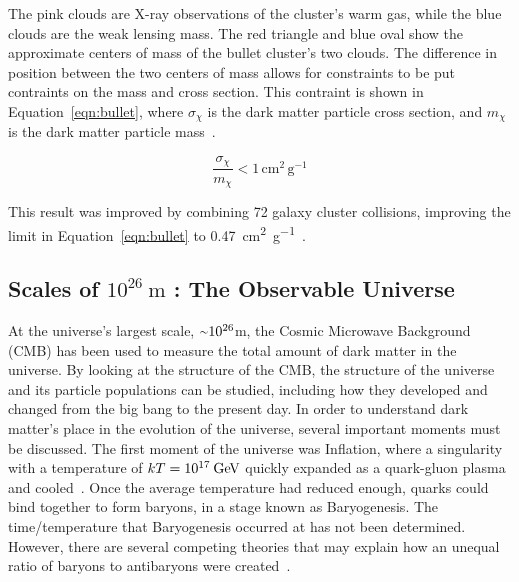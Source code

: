 The pink clouds are X-ray observations of the cluster's warm gas, while the blue clouds are the weak lensing mass.
The red triangle and blue oval show the approximate centers of mass of the bullet cluster's two clouds.
The difference in position between the two centers of mass allows for constraints to be put contraints on the mass and cross section.
This contraint is shown in Equation~\ref{eqn:bullet}, where $\sigma_{\chi}$ is the dark matter particle cross section, and $m_{\chi}$ is the dark matter particle mass~\cite{bullet_cluster,bullet_cluster2}.

\begin{equation}\label{eqn:bullet}
  \frac{\sigma_{\chi}}{m_{\chi}} < 1 \, \textrm{cm}^2 \, \textrm{g}^{-1}
\end{equation}

This result was improved by combining 72 galaxy cluster collisions, improving the limit in Equation~\ref{eqn:bullet} to \SI{0.47}{cm^{2} g^{-1}}~\cite{cluster_72}.


\subsection{Scales of $10^{26}\:\text{m}$ : The Observable Universe}\label{dm_universe}
At the universe's largest scale, $\nicetilde 10^{26}$m, the Cosmic Microwave Background (CMB) has been used to measure the total amount of dark matter in the universe.
By looking at the structure of the CMB, the structure of the universe and its particle populations can be studied, including how they developed and changed from the big bang to the present day.
In order to understand dark matter's place in the evolution of the universe, several important moments must be discussed.
The first moment of the universe was Inflation, where a singularity with a temperature of $kT=10^{17}\:\textrm{\GeV{}}$ quickly expanded as a quark-gluon plasma and cooled~\cite{inflation0,inflation1,inflation2,inflation3}.
Once the average temperature had reduced enough, quarks could bind together to form baryons, in a stage known as Baryogenesis.
The time/temperature that Baryogenesis occurred at has not been determined.
However, there are several competing theories that may explain how an unequal ratio of baryons to antibaryons were created~\cite{baryogenesis1,baryogenesis2}.

